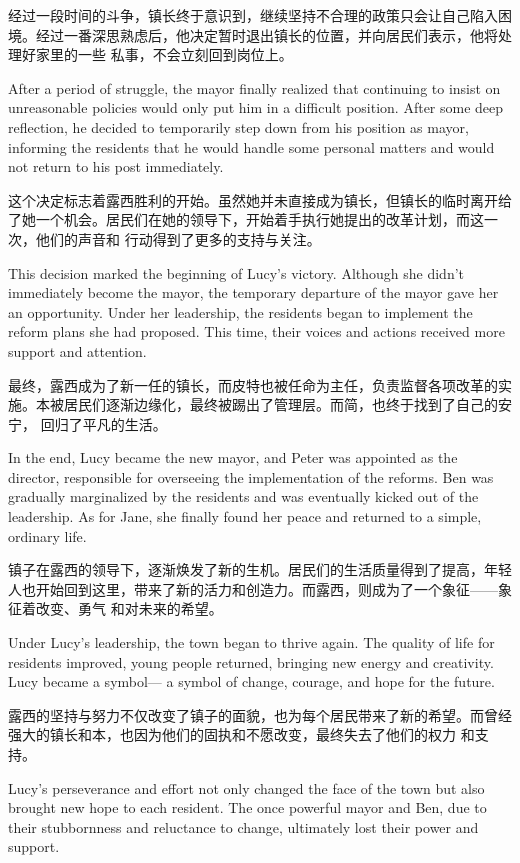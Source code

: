 经过一段时间的斗争，镇长终于意识到，继续坚持不合理的政策只会让自己陷入困境。经过一番深思熟虑后，他决定暂时退出镇长的位置，并向居民们表示，他将处理好家里的一些
私事，不会立刻回到岗位上。

\begin{flushright} After a period of struggle, the mayor finally realized that
    continuing to insist on unreasonable policies would only put him in a
    difficult
    position. After some deep reflection, he decided to temporarily step down
    from
    his position as mayor, informing the residents that he would handle some
    personal matters and would not return to his post immediately.
\end{flushright}

这个决定标志着露西胜利的开始。虽然她并未直接成为镇长，但镇长的临时离开给了她一个机会。居民们在她的领导下，开始着手执行她提出的改革计划，而这一次，他们的声音和
行动得到了更多的支持与关注。

\begin{flushright} This decision marked the beginning of Lucy’s victory.
    Although she didn’t immediately become the mayor, the temporary departure
    of
    the mayor gave her an opportunity. Under her leadership, the residents
    began to
    implement the reform plans she had proposed. This time, their voices and
    actions received more support and attention. \end{flushright}

最终，露西成为了新一任的镇长，而皮特也被任命为主任，负责监督各项改革的实施。本被居民们逐渐边缘化，最终被踢出了管理层。而简，也终于找到了自己的安宁，
回归了平凡的生活。

\begin{flushright} In the end, Lucy became the new mayor, and Peter was
    appointed as the director, responsible for overseeing the implementation of
    the
    reforms. Ben was gradually marginalized by the residents and was eventually
    kicked out of the leadership. As for Jane, she finally found her peace and
    returned to a simple, ordinary life. \end{flushright}

镇子在露西的领导下，逐渐焕发了新的生机。居民们的生活质量得到了提高，年轻人也开始回到这里，带来了新的活力和创造力。而露西，则成为了一个象征——象征着改变、勇气
和对未来的希望。

\begin{flushright} Under Lucy’s leadership, the town began to thrive again. The
    quality of life for residents improved, young people returned, bringing new
    energy and creativity. Lucy became a symbol— a symbol of change, courage,
    and
    hope for the future. \end{flushright}

露西的坚持与努力不仅改变了镇子的面貌，也为每个居民带来了新的希望。而曾经强大的镇长和本，也因为他们的固执和不愿改变，最终失去了他们的权力
和支持。

\begin{flushright} Lucy’s perseverance
    and effort not only changed the face of the town but also brought new hope
    to
    each resident. The once powerful mayor and Ben, due to their stubbornness
    and
    reluctance to change, ultimately lost their power and support.
\end{flushright}
